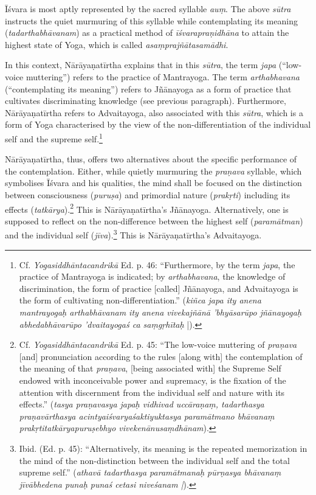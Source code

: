 Īśvara is most aptly represented by the sacred syllable \textit{auṃ}. The above \textit{sūtra} instructs the quiet murmuring of this syllable while contemplating its meaning (\textit{tadarthabhāvanam}) as a practical method of \textit{īśvarapraṇidhāna} to attain the highest state of Yoga, which is called \textit{asaṃprajñātasamādhi}.

In this context, Nārāyaṇatīrtha explains that in this \textit{sūtra}, the term \textit{japa} (``low-voice muttering'') refers to the practice of Mantrayoga. The term \textit{arthabhavana} (``contemplating its meaning'') refers to Jñānayoga as a form of practice that cultivates discriminating knowledge (see previous paragraph). Furthermore, Nārāyaṇatīrtha refers to Advaitayoga, also associated with this \textit{sūtra}, which is a form of Yoga characterised by the view of the non-differentiation of the individual self and the supreme self.\footnote{Cf. \textit{Yogasiddhāntacandrikā} Ed. p. 46: ``Furthermore, by the term \textit{japa}, the practice of Mantrayoga is indicated; by \textit{arthabhavana}, the knowledge of discrimination, the form of practice [called] Jñānayoga, and Advaitayoga is the form of cultivating non-differentiation.'' (\textit{kiñca japa ity anena mantrayogaḥ arthabhāvanam ity anena vivekajñānā 'bhyāsarūpo jñānayogaḥ abhedabhāvarūpo 'dvaitayogaś ca saṃgṛhītaḥ} |).}

Nārāyaṇatīrtha, thus, offers two alternatives about the specific performance of the contemplation. Either, while quietly murmuring the \textit{praṇava} syllable, which symbolises Īśvara and his qualities, the mind shall be focused on the distinction between consciousness (\textit{puruṣa}) and primordial nature (\textit{prakṛti}) including its effects (\textit{tatkārya}).\footnote{Cf. \textit{Yogasiddhāntacandrikā} Ed. p. 45: ``The low-voice muttering of \textit{praṇava} [and] pronunciation according to the rules [along with] the contemplation of the meaning of that \textit{praṇava}, [being associated with] the Supreme Self endowed with inconceivable power and supremacy, is the fixation of the attention with discernment from the individual self and nature with its effects.'' (\textit{tasya praṇavasya japaḥ vidhivad uccāraṇaṃ, tadarthasya praṇavārthasya acintyaiśvaryaśaktiyuktasya paramātmano bhāvanaṃ prakṛtitatkāryapuruṣebhyo vivekenānusaṃdhānam}).} This is Nārāyaṇatīrtha's Jñānayoga. Alternatively, one is supposed to reflect on the non-difference between the highest self (\textit{paramātman}) and the individual self (\textit{jīva}).\footnote{Ibid. (Ed. p. 45): ``Alternatively, its meaning is the repeated memorization in the mind of the non-distinction between the individual self and the total supreme self.'' (\textit{athavā tadarthasya paramātmanaḥ pūrṇasya bhāvanaṃ jīvābhedena punaḥ punaś cetasi niveśanam |}).} This is Nārāyaṇatīrtha's Advaitayoga.

